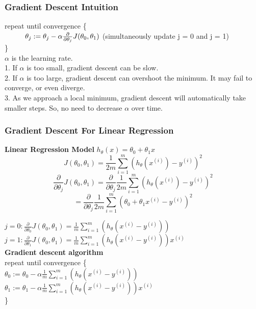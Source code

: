 \documentclass{article}
\newcommand\tab[1][1cm]{\hspace*{#1}}
\begin{document}
\subsubsection{Gradient Descent Intuition}
repeat until convergence \{\\
$\tab \theta_j := \theta_j - \alpha \frac{\partial}{\partial \theta_j}J(\theta_0, \theta_1) $ (simultaneously update j = 0 and j = 1)\\
\}\\

$\alpha$ is the learning rate. \\
1. If $\alpha$ is too small, gradient descent can be slow. \\
2. If $\alpha$ is too large, gradient descent can overshoot the minimum. It may fail to converge, or even diverge. \\
3. As we approach a local minimum, gradient descent will automatically take smaller steps. So, no need to decrease $\alpha$ over time. \\

\subsubsection{Gradient Descent For Linear Regression}
\textbf{Linear Regression Model}
$h_\theta(x) = \theta_0 + \theta_1 x$
$$J(\theta_0, \theta_1) = \frac{1}{2m} \sum_{i=1}^{m}(h_\theta(x^{(i)}) - y^{(i)})^2$$
$$\frac{\partial}{\partial \theta_j}J(\theta_0, \theta_1) = \frac{\partial}{\partial \theta_j} \frac{1}{2m} \sum_{i=1}^{m}(h_\theta(x^{(i)}) - y^{(i)})^2$$
$$ = \frac{\partial}{\partial \theta_j} \frac{1}{2m} \sum_{i=1}^{m}(\theta_0 + \theta_1 x^{(i)} - y^{(i)})^2$$

$j = 0: \frac{\partial}{\partial \theta_0}J(\theta_0, \theta_1) = \frac{1}{m} \sum_{i=1}^{m}(h_\theta(x^{(i)} - y^{(i)}))$\\
$j = 1: \frac{\partial}{\partial \theta_1}J(\theta_0, \theta_1) = \frac{1}{m} \sum_{i=1}^{m}(h_\theta(x^{(i)} - y^{(i)})) x^{(i)}$\\

\textbf{Gradient descent algorithm}\\
repeat until convergence \{\\
\tab $\theta_0 := \theta_0 - \alpha \frac{1}{m} \sum_{i=1}^{m}(h_\theta(x^{(i)} - y^{(i)})) $ \\
\tab $\theta_1 := \theta_1 - \alpha \frac{1}{m} \sum_{i=1}^{m}(h_\theta(x^{(i)} - y^{(i)})) x^{(i)} $ \\
\}\\
\end{document}
